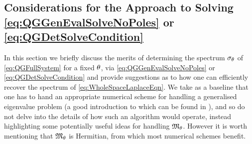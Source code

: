 \subsection{Considerations for the Approach to Solving \eqref{eq:QGGenEvalSolveNoPoles} or \eqref{eq:QGDetSolveCondition}} \label{ssec:ApproachConsiderations}
In this section we briefly discuss the merits of determining the spectrum $\sigma_\theta$ of \eqref{eq:QGFullSystem} for a fixed $\theta$, via \eqref{eq:QGGenEvalSolveNoPoles} or \eqref{eq:QGDetSolveCondition} and provide suggestions as to how one can efficiently recover the spectrum of \eqref{eq:WholeSpaceLaplaceEqn}.
We take as a baseline that one has to hand an appropriate numerical scheme for handling a generalised eigenvalue problem (a good introduction to which can be found in \cite{guttel2017nonlinear}), and so do not delve into the details of how such an algorithm would operate, instead highlighting some potentially useful ideas for handling $\mathfrak{M}_\theta$.
However it is worth mentioning that $\mathfrak{M}_\theta$ is Hermitian, from which most numerical schemes benefit.

